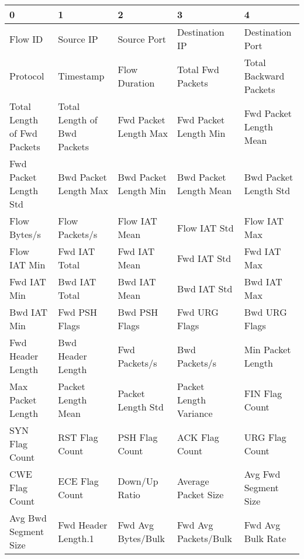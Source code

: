 \begin{tabular}{lllll}
\toprule
                           0 &                            1 &                       2 &                        3 &                       4 \\
\midrule
                     Flow ID &                    Source IP &             Source Port &           Destination IP &        Destination Port \\
                    Protocol &                    Timestamp &           Flow Duration &        Total Fwd Packets &  Total Backward Packets \\
 Total Length of Fwd Packets &  Total Length of Bwd Packets &   Fwd Packet Length Max &    Fwd Packet Length Min &  Fwd Packet Length Mean \\
       Fwd Packet Length Std &        Bwd Packet Length Max &   Bwd Packet Length Min &   Bwd Packet Length Mean &   Bwd Packet Length Std \\
                Flow Bytes/s &               Flow Packets/s &           Flow IAT Mean &             Flow IAT Std &            Flow IAT Max \\
                Flow IAT Min &                Fwd IAT Total &            Fwd IAT Mean &              Fwd IAT Std &             Fwd IAT Max \\
                 Fwd IAT Min &                Bwd IAT Total &            Bwd IAT Mean &              Bwd IAT Std &             Bwd IAT Max \\
                 Bwd IAT Min &                Fwd PSH Flags &           Bwd PSH Flags &            Fwd URG Flags &           Bwd URG Flags \\
           Fwd Header Length &            Bwd Header Length &           Fwd Packets/s &            Bwd Packets/s &       Min Packet Length \\
           Max Packet Length &           Packet Length Mean &       Packet Length Std &   Packet Length Variance &          FIN Flag Count \\
              SYN Flag Count &               RST Flag Count &          PSH Flag Count &           ACK Flag Count &          URG Flag Count \\
              CWE Flag Count &               ECE Flag Count &           Down/Up Ratio &      Average Packet Size &    Avg Fwd Segment Size \\
        Avg Bwd Segment Size &          Fwd Header Length.1 &      Fwd Avg Bytes/Bulk &     Fwd Avg Packets/Bulk &       Fwd Avg Bulk Rate \\

\end{tabular}

